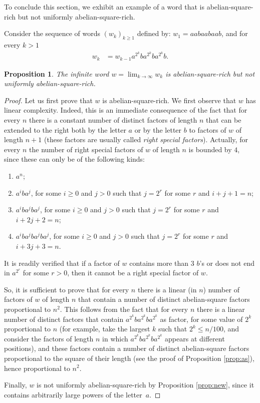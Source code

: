 \documentclass[11pt,reqno]{amsart}
\numberwithin{equation}{section}
\theoremstyle{plain}
\newtheorem{proposition}[theorem]{Proposition}
\theoremstyle{definition}
\theoremstyle{remark}
\begin{document}

To conclude this section, we exhibit an example of a word that is abelian-square-rich but not uniformly abelian-square-rich.

Consider the sequence of words $(w_k)_{k\geq 1}$  defined by: $w_1=aabaabaab$,  and for every $k> 1$ 
\begin{align}\label{eq:len}
w_{k} &= w_{k-1}a^{2^k}ba^{2^k}ba^{2^k}b.
\end{align}

\begin{proposition}
 The infinite word $w=\lim_{k\to \infty}w_k$ is  abelian-square-rich but not uniformly abelian-square-rich.
\end{proposition}

\begin{proof}
Let us first prove that $w$ is abelian-square-rich. We first observe that $w$ has linear complexity. Indeed, this is an immediate consequence of the fact that for every $n$ there is a constant number of distinct factors of length $n$ that can be extended to the right both by the letter $a$ or by the letter $b$ to factors of $w$ of length $n+1$ (these factors are usually called \emph{right special factors}). Actually, for every $n$ the number of right special factors of $w$ of length $n$ is bounded by $4$, since these can only be of the following kinds:
\begin{enumerate}
\item $a^n$;
\item $a^iba^j$, for some $i\geq 0$ and $j>0$ such that $j=2^r$ for some $r$ and $i+j+1=n$;
\item $a^iba^jba^j$, for some $i\geq 0$ and $j>0$ such that $j=2^r$ for some $r$ and $i+2j+2=n$;
\item $a^iba^jba^jba^j$, for some $i\geq 0$ and $j>0$ such that $j=2^r$ for some $r$ and $i+3j+3=n$.
\end{enumerate}
It is readily verified that if a factor of $w$ contains more than $3$ $b$'s or does not end in $a^{2^r}$ for some $r>0$, then it cannot be a right special factor of $w$.

So, it is sufficient to prove that for every $n$ there is a linear (in $n$) number of factors of $w$ of length $n$ that contain a number of distinct abelian-square factors proportional to $n^2$. This follows from the fact that for every $n$ there is a linear number of distinct factors that contain $a^{2^k}ba^{2^k}ba^{2^k}$ as factor, for some value of $2^k$ proportional to $n$ (for example, take the largest $k$ such that $2^k\leq n/100$, and consider the factors of length $n$ in which $a^{2^k}ba^{2^k}ba^{2^k}$ appears at different positions), and these factors contain a number of distinct abelian-square factors proportional to the square of their length (see the proof of Proposition \ref{prop:as}), hence proportional to $n^2$.

Finally, $w$ is not  uniformly abelian-square-rich  by Proposition \ref{prop:new}, since it contains arbitrarily large powers of the letter~$a$.
\end{proof}
\end{document}

